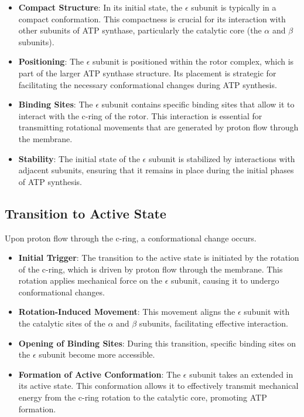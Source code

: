 \documentclass{article}
\begin{document}
\begin{itemize}
    \item  \textbf{Compact Structure}: In its initial state, the $\epsilon$ subunit is typically in a compact conformation. This compactness is crucial for its interaction with other subunits of ATP synthase, particularly the catalytic core (the $\alpha$ and $\beta$ subunits).
    \item \textbf{Positioning}: The $\epsilon$ subunit is positioned within the rotor complex, which is part of the larger ATP synthase structure. Its placement is strategic for facilitating the necessary conformational changes during ATP synthesis.
    \item \textbf{Binding Sites}: The $\epsilon$ subunit contains specific binding sites that allow it to interact with the c-ring of the rotor. This interaction is essential for transmitting rotational movements that are generated by proton flow through the membrane.
    \item \textbf{Stability}: The initial state of the $\epsilon$ subunit is stabilized by interactions with adjacent subunits, ensuring that it remains in place during the initial phases of ATP synthesis.
\end{itemize}

\subsection{Transition to Active State}

Upon proton flow through the c-ring, a conformational change occurs.

\begin{itemize}
    \item  \textbf{Initial Trigger}: The transition to the active state is initiated by the rotation of the c-ring, which is driven by proton flow through the membrane. This rotation applies mechanical force on the $\epsilon$ subunit, causing it to undergo conformational changes.
    \item  \textbf{Rotation-Induced Movement}: This movement aligns the $\epsilon$ subunit with the catalytic sites of the $\alpha$ and $\beta$ subunits, facilitating effective interaction.
    \item  \textbf{Opening of Binding Sites}: During this transition, specific binding sites on the $\epsilon$ subunit become more accessible.
    \item \textbf{Formation of Active Conformation}: The $\epsilon$ subunit takes an extended in its active state. This conformation allows it to effectively transmit mechanical energy from the c-ring rotation to the catalytic core, promoting ATP formation.
\end{itemize}
\end{document}
